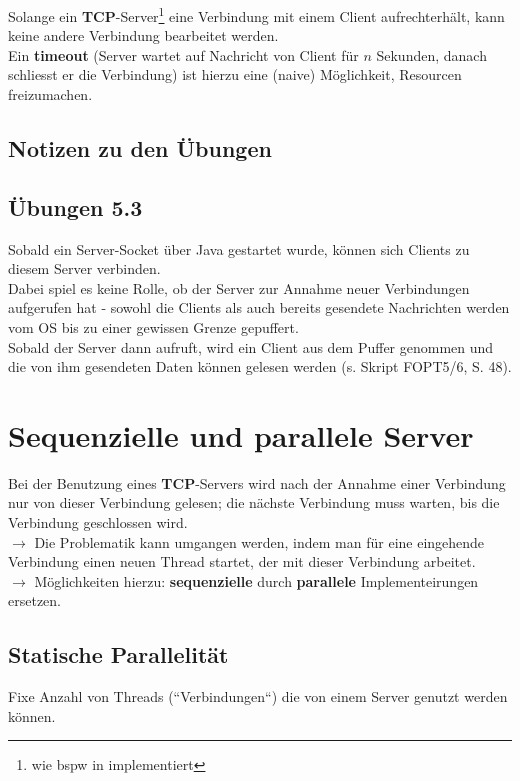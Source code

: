 \noindent
Solange ein \textbf{TCP}-Server\footnote{
 wie bspw in \cite[288, Listing 5.8]{Oec22} implementiert
} eine Verbindung mit einem Client aufrechterhält, kann keine andere Verbindung bearbeitet werden.\\
Ein \textbf{timeout} (Server wartet auf Nachricht von Client für $n$ Sekunden, danach schliesst er die Verbindung) ist hierzu eine (naive) Möglichkeit, Resourcen freizumachen.

\subsection{Notizen zu den Übungen}
\subsection*{Übungen 5.3}
Sobald ein Server-Socket über Java gestartet wurde, können sich Clients zu diesem Server verbinden.\\
Dabei spiel es keine Rolle, ob der Server  zur Annahme neuer Verbindungen aufgerufen hat - sowohl die Clients als auch bereits gesendete Nachrichten werden vom OS bis zu einer gewissen Grenze gepuffert.\\
Sobald der Server dann  aufruft, wird ein Client aus dem Puffer genommen und die von ihm gesendeten Daten können gelesen werden (s. Skript FOPT5/6, S. 48).

\section{Sequenzielle und parallele Server}

Bei der Benutzung eines \textbf{TCP}-Servers wird nach der Annahme einer Verbindung nur von dieser Verbindung gelesen; die nächste Verbindung muss warten, bis die Verbindung geschlossen wird.\\
$\rightarrow$ Die Problematik kann umgangen werden, indem man für eine eingehende Verbindung einen neuen Thread startet, der mit dieser Verbindung arbeitet.\\

\noindent
$\rightarrow$ Möglichkeiten hierzu: \textbf{sequenzielle} durch \textbf{parallele} Implementeirungen ersetzen.\\

\subsection*{Statische Parallelität}
Fixe Anzahl von Threads (``Verbindungen``) die von einem Server genutzt werden können.\\

